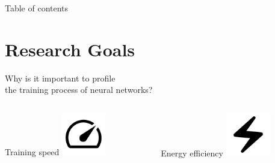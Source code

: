 \documentclass[compress,aspectratio=169]{beamer}
\title{\Large \mytitle}
\date{\mydate}
\subtitle{\mysubtitle}
\author{{\myauthor}}
\institute{\myinstitute}
\begin{document}
\begin{frame}[plain]
	\titlepage
\end{frame}

\begin{frame}[t]{Table of contents}
  \tableofcontents[subsectionstyle=hide/hide]
\end{frame}


\section{Research Goals}

\iffalse
\begin{frame}{Why is it important to profile\\the training process of neural networks?}

    \begin{columns}
        \begin{column}{0.5\textwidth}
            \begin{block}{\centering Training speed}
                \centering
                \vspace{3em}
                \includegraphics[width=0.3\textwidth]{assets/speed_FILL0_wght400_GRAD0_opsz48.png}
            \end{block}
        \end{column}
        \begin{column}{0.5\textwidth}
            \begin{block}{\centering Energy efficiency}
                \centering
                \vspace{3em}
                \includegraphics[width=0.3\textwidth]{assets/electric_bolt_FILL0_wght400_GRAD0_opsz48}
            \end{block}
        \end{column}
    \end{columns}

\end{frame}
\end{document}
